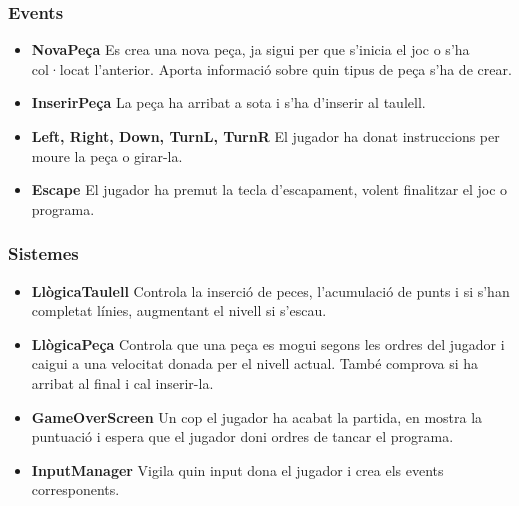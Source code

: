     \subsubsection{Events}

      \begin{itemize}
        \item {\bf NovaPeça}
          Es crea una nova peça, ja sigui per que s'inicia el joc o s'ha col·locat l'anterior. Aporta informació sobre quin tipus de peça s'ha de crear.
          
        \item {\bf InserirPeça}
          La peça ha arribat a sota i s'ha d'inserir al taulell.
          
        \item {\bf Left, Right, Down, TurnL, TurnR}
          El jugador ha donat instruccions per moure la peça o girar-la.
          
        \item {\bf Escape}
          El jugador ha premut la tecla d'escapament, volent finalitzar el joc o programa.
          
      \end{itemize}

    \subsubsection{Sistemes}

      \begin{itemize}
        \item {\bf LlògicaTaulell}
          Controla la inserció de peces, l'acumulació de punts i si s'han completat línies, augmentant el nivell si s'escau.
          
        \item {\bf LlògicaPeça}
          Controla que una peça es mogui segons les ordres del jugador i caigui a una velocitat donada per el nivell actual. També comprova si ha arribat al final i cal inserir-la.
          
        \item {\bf GameOverScreen}
          Un cop el jugador ha acabat la partida, en mostra la puntuació i espera que el jugador doni ordres de tancar el programa.
          
        \item {\bf InputManager}
          Vigila quin input dona el jugador i crea els events corresponents.
          
      \end{itemize}
      
